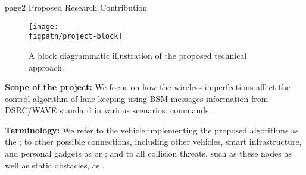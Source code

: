 page2
Proposed Research Contribution





\begin{figure}[h!]
	\centering
	\texttt{[image: \\figpath/project-block]}
	\caption{A block diagrammatic illustration of the proposed technical approach.}
	\label{fig-project-block}
\end{figure}

\textbf{Scope of the project:} We focus on how the wireless imperfections affect the control algorithm of lane keeping using BSM
messages information from DSRC/WAVE standard in various scenarios. 
commands. 

\textbf{Terminology:} We refer to the vehicle implementing the proposed algorithms as the 
; to other possible connections, including other vehicles, smart 
infrastructure, and personal gadgets as  or ; and to
all collision threats, such as these nodes as well as static obstacles, as .
%

